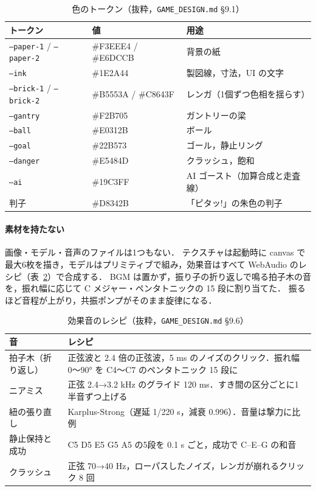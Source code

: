 \documentclass[a4paper,10pt]{ltjsarticle}
\newcommand{\tabref}[1]{表~\ref{#1}}
\newcommand{\code}[1]{\texttt{#1}}
\begin{document}
\begin{table}[H]
\centering
\caption{色のトークン（抜粋，\code{GAME\_DESIGN.md} \S 9.1）}
\label{tab:palette}
\small
\begin{tabular}{lll}
\toprule
トークン & 値 & 用途 \\
\midrule
\code{--paper-1} / \code{--paper-2} & \#F3EEE4 / \#E6DCCB & 背景の紙 \\
\code{--ink} & \#1E2A44 & 製図線，寸法，UI の文字 \\
\code{--brick-1} / \code{--brick-2} & \#B5553A / \#C8643F & レンガ（1個ずつ色相を揺らす） \\
\code{--gantry} & \#F2B705 & ガントリーの梁 \\
\code{--ball} & \#E0312B & ボール \\
\code{--goal} & \#22B573 & ゴール，静止リング \\
\code{--danger} & \#E5484D & クラッシュ，飽和 \\
\code{--ai} & \#19C3FF & AI ゴースト（加算合成と走査線） \\
判子 & \#D8342B & 「ピタッ!」の朱色の判子 \\
\bottomrule
\end{tabular}
\end{table}

\paragraph{素材を持たない} 画像・モデル・音声のファイルは1つもない．
テクスチャは起動時に canvas で最大6枚を描き，モデルはプリミティブで組み，効果音はすべて WebAudio のレシピ（\tabref{tab:sound}）で合成する．
BGM は置かず，振り子の折り返しで鳴る拍子木の音を，振れ幅に応じて C メジャー・ペンタトニックの 15 段に割り当てた．
振るほど音程が上がり，共振ポンプがそのまま旋律になる．

\begin{table}[H]
\centering
\caption{効果音のレシピ（抜粋，\code{GAME\_DESIGN.md} \S 9.6）}
\label{tab:sound}
\small
\begin{tabularx}{\linewidth}{lX}
\toprule
音 & レシピ \\
\midrule
拍子木（折り返し） & 正弦波と 2.4 倍の正弦波，5 ms のノイズのクリック．振れ幅 0〜90° を C4〜C7 のペンタトニック 15 段に \\
ニアミス & 正弦 2.4→3.2 kHz のグライド 120 ms．すき間の区分ごとに1半音ずつ上げる \\
紐の張り直し & Karplus-Strong（遅延 1/220 s，減衰 0.996）．音量は撃力に比例 \\
静止保持と成功 & C5 D5 E5 G5 A5 の5段を 0.1 s ごと，成功で C–E–G の和音 \\
クラッシュ & 正弦 70→40 Hz，ローパスしたノイズ，レンガが崩れるクリック 8 回 \\
\bottomrule
\end{tabularx}
\end{table}
\end{document}

